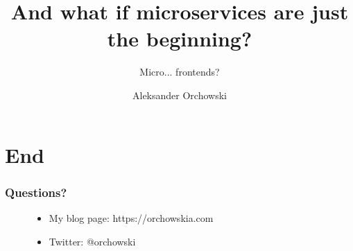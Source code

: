 \documentclass[usenames,dvipsnames]{beamer}
\title{And what if microservices are just the beginning?}
\subtitle{Micro... frontends?}
\author{Aleksander Orchowski}
\begin{document}



 








\section{End}
\begin{frame}[t]
\frametitle{Questions?}
\begin{figure}		
	\begin{itemize}
		\item My blog page: https://orchowskia.com
		\item Twitter: @orchowski
	\end{itemize}
\end{figure}

\end{frame}
\end{document}
